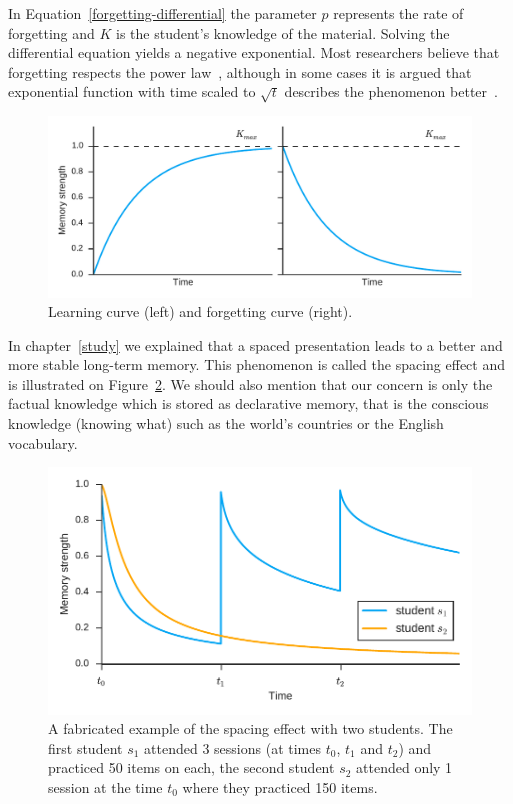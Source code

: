 In Equation~\ref{forgetting-differential} the parameter $p$ represents the rate of forgetting and $K$ is the student's knowledge of the material. Solving the differential equation yields a negative exponential. Most researchers believe that forgetting respects the power law~\cite{MichaelW.Eysenck2008}, although in some cases it is argued that exponential function with time scaled to $\sqrt{t}$ describes the phenomenon better~\cite{White2001}.

\begin{figure}[htbp]
  \centering
  \includegraphics[width=\textwidth]{img/learning-forgetting-curves}
  \caption{Learning curve (left) and forgetting curve (right).}
  \label{fig:learning-forgetting-curves}
\end{figure}

In chapter~\ref{study} we explained that a spaced presentation leads to a better and more stable long-term memory. This phenomenon is called the spacing effect and is illustrated on Figure~\ref{fig:spacing-effect}. We should also mention that our concern is only the factual knowledge which is stored as declarative memory, that is the conscious knowledge (knowing what) such as the world's countries or the English vocabulary.

\begin{figure}[htbp]
  \centering
  \includegraphics[width=\textwidth]{img/spacing-effect}
  \caption{A fabricated example of the spacing effect with two students. The first student $s_1$ attended 3 sessions (at times $t_0$, $t_1$ and $t_2$) and practiced 50 items on each, the second student $s_2$ attended only 1 session at the time $t_0$ where they practiced 150 items.}
  \label{fig:spacing-effect}
\end{figure}

